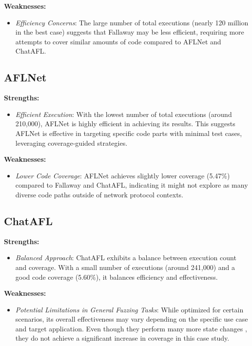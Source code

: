 \textbf{Weaknesses:}
\begin{itemize}
    \item \textit{Efficiency Concerns}: The large number of total executions (nearly 120 million in the best case) suggests that Fallaway may be less efficient, requiring more attempts to cover similar amounts of code compared to AFLNet and ChatAFL.
\end{itemize}


\subsection{AFLNet}

\textbf{Strengths:}
\begin{itemize}
    \item \textit{Efficient Execution}: With the lowest number of total executions (around 210,000), AFLNet is highly efficient in achieving its results. This suggests AFLNet is effective in targeting specific code parts with minimal test cases, leveraging coverage-guided strategies.
\end{itemize}

\textbf{Weaknesses:}
\begin{itemize}
    \item \textit{Lower Code Coverage}: AFLNet achieves slightly lower coverage (5.47\%) compared to Fallaway and ChatAFL, indicating it might not explore as many diverse code paths outside of network protocol contexts.
\end{itemize}

\subsection{ChatAFL}

\textbf{Strengths:}
\begin{itemize}
    \item \textit{Balanced Approach}: ChatAFL exhibits a balance between execution count and coverage. With a small number of executions (around 241,000) and a good code coverage (5.60\%), it balances efficiency and effectiveness.
\end{itemize}

\textbf{Weaknesses:}
\begin{itemize}
    \item \textit{Potential Limitations in General Fuzzing Tasks}: While optimized for certain scenarios, its overall effectiveness may vary depending on the specific use case and target application. Even though they perform many more state changes \cite{chatafl}, they do not achieve a significant increase in coverage in this case study.
\end{itemize}